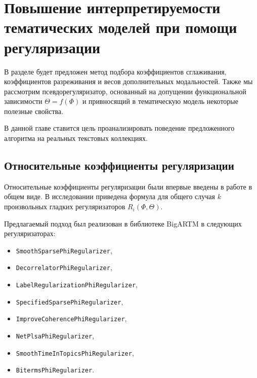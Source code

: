 \chapter{Повышение интерпретируемости тематических моделей при помощи регуляризации}

В разделе будет предложен метод подбора коэффициентов сглаживания, коэффициентов разреживания и весов дополнительных модальностей. Также мы рассмотрим псевдорегуляризатор, основанный на допущении функциональной зависимости $\Theta = f(\Phi)$ и привносящий в тематическую модель некоторые полезные свойства.

В данной главе ставится цель проанализировать поведение предложенного алгоритма на реальных текстовых коллекциях.

\section{Относительные коэффициенты регуляризации} \label{sec:relative}



Относительные коэффициенты регуляризации были впервые введены в работе \cite{doykov} в общем виде.  В исследовании \cite{doykov} приведена формула для общего случая $k$ произвольных гладких регуляризаторов $R_i(\Phi, \Theta)$.

Предлагаемый подход был реализован в библиотеке BigARTM в следующих регуляризаторах: 
\begin{itemize}
    \item 
\texttt{SmoothSparsePhiRegularizer},
    \item 
\texttt{DecorrelatorPhiRegularizer},
    \item 
\texttt{LabelRegularizationPhiRegularizer},
    \item 
\texttt{SpecifiedSparsePhiRegularizer},
    \item 
\texttt{ImproveCoherencePhiRegularizer},
    \item 
\texttt{NetPlsaPhiRegularizer},
    \item 
\texttt{SmoothTimeInTopicsPhiRegularizer},
    \item 
\texttt{BitermsPhiRegularizer}.
\end{itemize}


